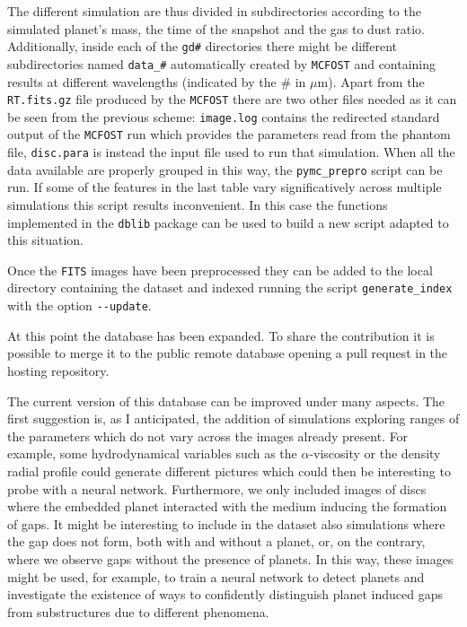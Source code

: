 \documentclass[a4paper,10pt]{report}
\begin{document}
\begin{center}
\begin{minipage}{\textwidth}
\end{minipage}
\end{center}
The different simulation are thus divided in subdirectories according to the simulated planet's mass, the time of the
snapshot and the gas to dust ratio. Additionally, inside each of the \lstinline{gd#} directories 
there might be different subdirectories named \lstinline{data_#} automatically created by \lstinline{MCFOST} 
and containing results at different wavelengths (indicated by the \# in $\mu$m).
Apart from the \lstinline{RT.fits.gz} file produced by the \lstinline{MCFOST} there are two other files needed as it can be seen
from the previous scheme: \lstinline{image.log} contains the redirected standard output of the \lstinline{MCFOST} run which 
provides the parameters read from the phantom file,
\lstinline{disc.para} is instead the input file used to run that simulation.
When all the data available are properly grouped in this way, the \lstinline{pymc_prepro} script
can be run. If some of the features in the last table vary significatively across multiple simulations this script 
results inconvenient. In this case the functions implemented in the \lstinline{dblib} package can be used
to build a new script adapted to
this situation.

Once the \lstinline{FITS} images have been preprocessed they can be added to the local directory containing the dataset 
and indexed running the script \lstinline{generate_index} with the option \lstinline{--update}. 

At this point the database has been expanded. To share the contribution it is possible to merge it to the public remote database
opening a pull request in the hosting repository. 

The current version of this database can be improved under many aspects. The first suggestion
is, as I anticipated, the addition of simulations exploring ranges of the parameters which do not vary across the images already present.
For example, some hydrodynamical variables such as the $\alpha$-viscosity 
or the density radial profile could generate different pictures which could then be interesting to probe with a neural network.
Furthermore, we only included images of discs where the embedded planet interacted with the medium inducing the formation of
gaps. It might be interesting to include in the dataset also simulations where the gap does
not form, both with and without a planet, or, on the contrary, where we observe gaps without the presence of planets.
In this way, these images might be used, for example, to train a neural network to detect planets and investigate
the existence of ways to confidently distinguish planet induced gaps from substructures due to different phenomena. 
\end{document}
